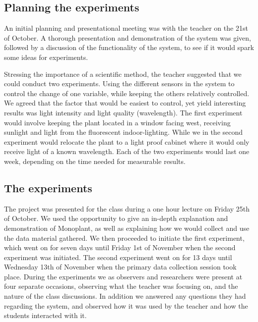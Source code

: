 \subsection{Planning the experiments}
An initial planning and presentational meeting was with the teacher on the 21st of October. A thorough presentation and demonstration of the system was given, followed by a discussion of the functionality of the system, to see if it would spark some ideas for experiments. 

Stressing the importance of a scientific method, the teacher suggested that we could conduct two experiments. Using the different sensors in the system to control the change of one variable, while keeping the others relatively controlled. We agreed that the factor that would be easiest to control, yet yield interesting results was light intensity and light quality (wavelength). The first experiment would involve keeping the plant located in a window facing west, receiving sunlight and light from the fluorescent indoor-lighting. While we in the second experiment would relocate the plant to a light proof cabinet where it would only receive light of a known wavelength. Each of the two experiments would last one week, depending on the time needed for measurable results.

\subsection{The experiments}
The project was presented for the class during a one hour lecture on Friday 25th of October. We used the opportunity to give an in-depth explanation and demonstration of Monoplant, as well as explaining how we would collect and use the data material gathered. We then proceeded to initiate the first experiment, which went on for seven days until Friday 1st of November when the second experiment was initiated. The second experiment went on for 13 days until Wednesday 13th of November when the primary data collection session took place. During the experiments we as observers and researchers were present at four separate occasions, observing what the teacher was focusing on, and the nature of the class discussions. In addition we answered any questions they had regarding the system, and observed how it was used by the teacher and how the students interacted with it. 

